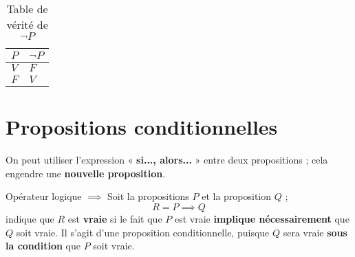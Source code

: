\documentclass[16pt]{report}
\begin{document}
\begin{multicols*}{2}
                \begin{table}[H]
                  \caption {Table de vérité de $ \neg P$}
                  \begin{center}
                   \renewcommand{\arraystretch}{1.5}
                   \selectfont
                    \normalsize
                        \begin{tabular}{|l||l|}
                        \arrayrulecolor{blue}\hline
                        \rowcolor{lightBlue}
                        \textcolor{myb}{$P$} & \textcolor{myb}{$\neg P$} 
                        \\
                        \hline
                        \hline
                        \arrayrulecolor{black}
                        $V$ & \cellcolor{myr} $F$
                        \\
                        \hline 
                        $F$ & \cellcolor{myg} $V$ 
                        \\ 
                        \hline
                        \end{tabular}
                \end{center}
                \end{table}


                \section{Propositions conditionnelles}



                On peut utiliser l'expression « \textbf{si..., alors...} » entre deux propositions ; cela engendre une 
                \textbf{nouvelle proposition}. 
                \begin{Syntaxe}{Opérateur logique $\implies$ }{}
                    Soit la propositions $P$ et la proposition $Q$ ; 
                    \[ R = P \implies  Q \] 
                    indique que $R$ est \textbf{vraie} si 
                    le fait que $P$ est vraie \textbf{implique nécessairement} que $Q$ soit vraie. Il s'agit d'une 
                    proposition conditionnelle, puisque $Q$ sera vraie \textbf{sous la condition} que $P$ soit vraie.  
                \end{Syntaxe}



\end{multicols*}
\end{document}
